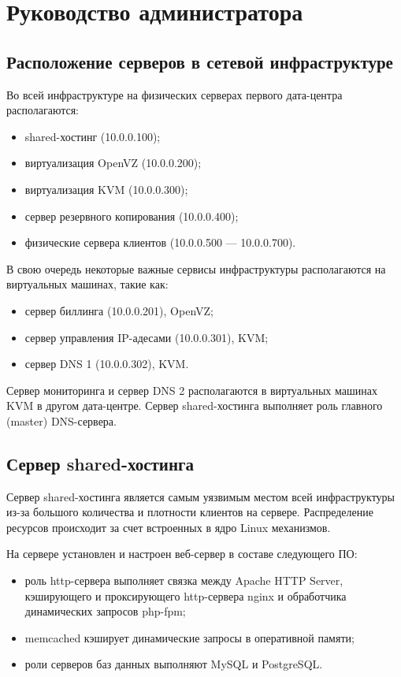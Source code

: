\section{Руководство администратора}

\subsection{Расположение серверов в сетевой инфраструктуре}
Во всей инфраструктуре на физических серверах первого дата-центра располагаются:
\begin{itemize}
  \item shared-хостинг (10.0.0.100);
  \item виртуализация OpenVZ (10.0.0.200);
  \item виртуализация KVM (10.0.0.300);
  \item сервер резервного копирования (10.0.0.400);
  \item физические сервера клиентов (10.0.0.500 --- 10.0.0.700).
\end{itemize}

В свою очередь некоторые важные сервисы инфраструктуры располагаются на виртуальных машинах, такие как:
\begin{itemize}
  \item сервер биллинга (10.0.0.201), OpenVZ;
  \item сервер управления IP-адесами (10.0.0.301), KVM;
  \item сервер DNS 1 (10.0.0.302), KVM.
\end{itemize}

Сервер мониторинга и сервер DNS 2 располагаются в виртуальных машинах KVM в другом дата-центре.
Сервер shared-хостинга выполняет роль главного (master) DNS-сервера.

\subsection{Сервер shared-хостинга}

Сервер shared-хостинга является самым уязвимым местом всей инфраструктуры из-за большого количества и плотности клиентов на сервере.
Распределение ресурсов происходит за счет встроенных в ядро Linux механизмов.

На сервере установлен и настроен веб-сервер в составе следующего ПО:
\begin{itemize}
  \item роль http-сервера выполняет связка между Apache HTTP Server, кэширующего и проксирующего http-сервера nginx и обработчика динамических запросов php-fpm;
  \item memcached кэширует динамические запросы в оперативной памяти;
  \item роли серверов баз данных выполняют MySQL и PostgreSQL.
\end{itemize}

